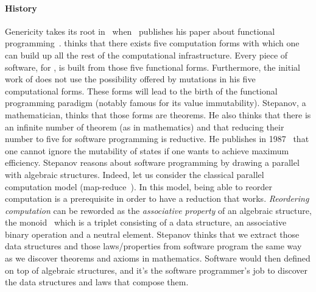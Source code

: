 \paragraph{History} Genericity takes its root in~
when~\citeauthor{backus.1978.functional} publishes his paper about functional
programming~\parencite{backus.1978.functional}. \citeauthor{backus.1978.functional} thinks that there exists five
computation forms with which one can build up all the rest of the computational infrastructure. Every piece of software,
for \citeauthor{backus.1978.functional}, is built from those five functional forms. Furthermore, the initial work of
\citeauthor{backus.1978.functional} does not use the possibility offered by mutations in his five computational forms.
These forms will lead to the birth of the functional programming paradigm (notably famous for its value immutability).
Stepanov, a mathematician, thinks that those forms are theorems. He also thinks that there is an infinite number of
theorem (as in mathematics) and that reducing their number to five for software programming is reductive. He publishes
in 1987~\parencite{stepanov.1987.higher} that one cannot ignore the mutability of states if one wants to achieve maximum
efficiency. Stepanov reasons about software programming by drawing a parallel with algebraic structures. Indeed, let us
consider the classical parallel computation model (map-reduce~\parencite{dean.2008.mapreduce}). In this model, being
able to reorder computation is a prerequisite in order to have a reduction that works. \emph{Reordering computation} can
be reworded as the \emph{associative property} of an algebraic structure, the monoid~\parencite{dean.2019.monoids} which
is a triplet consisting of a data structure, an associative binary operation and a neutral element. Stepanov thinks that
we extract those data structures and those laws/properties from software program the same way as we discover theorems
and axioms in mathematics. Software would then defined on top of algebraic structures, and it's the software
programmer's job to discover the data structures and laws that compose them.

